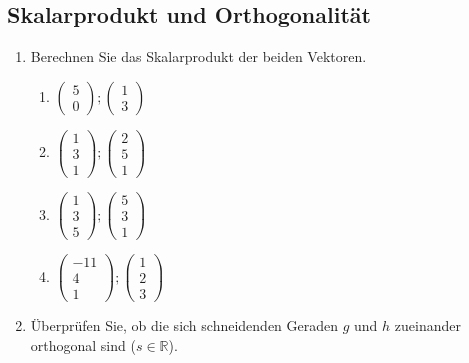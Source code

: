 \documentclass[12pt,a4paper,twoside,fleqn]{article}
\begin{document}
\subsection{Skalarprodukt und Orthogonalität}
\begin{enumerate}
\item Berechnen Sie das Skalarprodukt der beiden Vektoren.
  \begin{multicols}{4}
    \begin{enumerate}
    \item  $\begin{pmatrix}
      5\\0
    \end{pmatrix};
   \begin{pmatrix}
      1\\3
    \end{pmatrix} $
  \item $\begin{pmatrix}
      1\\3\\1
    \end{pmatrix};
   \begin{pmatrix}
      2\\5\\1
    \end{pmatrix} $
  \item $\begin{pmatrix}
      1\\3\\5
    \end{pmatrix};
   \begin{pmatrix}
      5\\3\\1
    \end{pmatrix} $
  \item  $\begin{pmatrix}
      -11\\4\\1
    \end{pmatrix};
   \begin{pmatrix}
      1\\2\\3
    \end{pmatrix} $
    \end{enumerate}
  \end{multicols}
\item Überprüfen Sie, ob die sich schneidenden Geraden $g$ und $h$
  zueinander orthogonal sind ($s\in\mathbb{R}$).
  

\end{enumerate}
\end{document}
